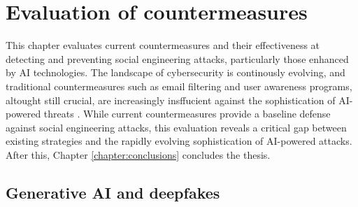 



\chapter{Evaluation of countermeasures\label{chapter:evaluation}}
\begin{comment}

Guides:
    - Rest of the thesis (thesis max of 20 - other chapters and pages)
    - Fill the thesis with content in this chapter

TODO:
    [ ] 

What to cover:
    - OpenAI attempts to control how ChatGPT etc are used
    - Efficacy of EU and other level regulations
    - Instagram flagging content that might've been generated with AI (this is futile in the future?)
    
Literature:
    - 

\end{comment}

This chapter evaluates current countermeasures and their effectiveness at detecting and preventing social engineering attacks, particularly those enhanced by AI technologies. The landscape of cybersecurity is continously evolving, and traditional countermeasures such as email filtering and user awareness programs, altought still crucial, are increasingly insffucient against the sophistication of AI-powered threats \citep{fakhouriAIDrivenSolutionsForSocialEngineeringAttacks2024}. While current countermeasures provide a baseline defense against social engineering attacks, this evaluation reveals a critical gap between existing strategies and the rapidly evolving sophistication of AI-powered attacks. After this, Chapter \ref{chapter:conclusions} concludes the thesis.













\section{Generative AI and deepfakes}

\begin{comment}    
    - Deepfake content detection
    - Spear phishing detection
\end{comment}


